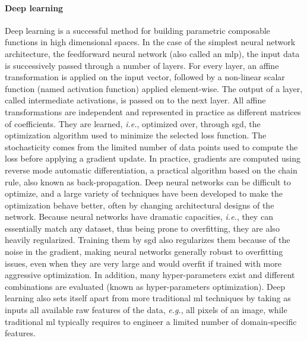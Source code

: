 \documentclass[11pt]{article}
\begin{document}
		\paragraph{Deep learning}
		Deep learning is a successful method for building parametric composable functions in high
		dimensional spaces.
		In the case of the simplest neural network architecture, the feedforward neural network
		(also called an \gls{mlp}), the input data is successively passed through a number of layers.
		For every layer, an affine transformation is applied on the input vector, followed by a non-linear
		scalar function (named activation function) applied element-wise.
		The output of a layer, called intermediate activations, is passed on to the next layer.
		All affine transformations are independent and represented in practice as different matrices of
		coefficients.
		They are learned, \textit{i.e.}, optimized over, through \gls{sgd}, the optimization algorithm used
		to minimize the selected loss function.
		The stochasticity comes from the limited number of data points used to compute the loss before
		applying a gradient update.
		In practice, gradients are computed using reverse mode automatic differentiation, a practical
		algorithm based on the chain rule, also known as back-propagation.
		Deep neural networks can be difficult to optimize, and a large variety of techniques have been
		developed to make the optimization behave better, often by changing architectural designs of the
		network.
		Because neural networks have dramatic capacities, \textit{i.e.}, they can essentially match any
		dataset, thus being prone to overfitting, they are also heavily regularized.
		Training them by \gls{sgd} also regularizes them because of the noise in the gradient, making
		neural networks generally robust to overfitting issues, even when they are very large and would
		overfit if trained with more aggressive optimization.
		In addition, many hyper-parameters exist and different combinations are evaluated (known as
		hyper-parameters optimization).
		Deep learning also sets itself apart from more traditional \gls{ml} techniques by taking as inputs
		all available raw features of the data, \textit{e.g.}, all pixels of an image, while traditional
		\gls{ml} typically requires to engineer a limited number of domain-specific features.
\end{document}
